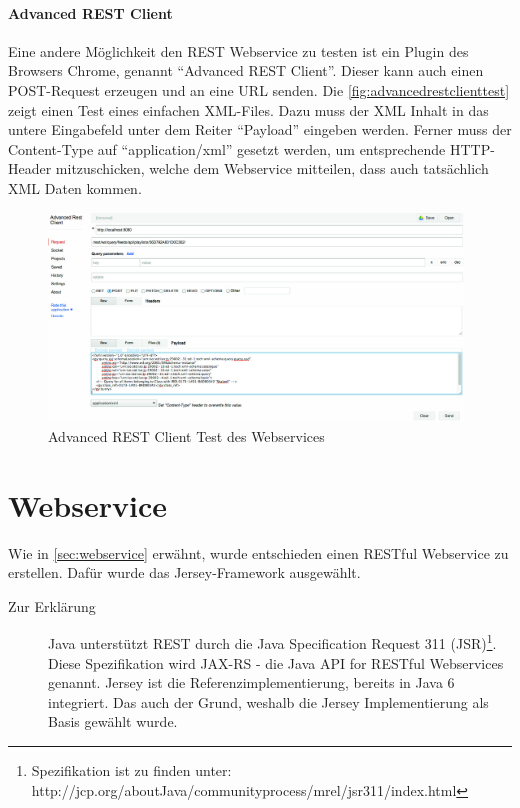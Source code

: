 \paragraph{Advanced REST Client} 

Eine andere Möglichkeit den \gls{REST} Webservice zu testen ist ein Plugin des Browsers Chrome, genannt \enquote{Advanced REST Client}. Dieser kann auch einen POST-Request erzeugen und an eine URL senden. Die \autoref{fig:advancedrestclienttest} zeigt einen Test eines einfachen XML-Files. Dazu muss der XML Inhalt in das untere Eingabefeld unter dem Reiter \enquote{Payload} eingeben werden. Ferner muss der Content-Type auf \enquote{application/xml} gesetzt werden, um entsprechende HTTP-Header mitzuschicken, welche dem Webservice mitteilen, dass auch tatsächlich XML Daten kommen. 

\begin{figure}[htbp]
	\centering
		\includegraphics[width=0.98\textwidth]{images/advanced_rest_client_test.jpg}
	\caption{Advanced REST Client Test des Webservices}
	\label{fig:advancedrestclienttest}
\end{figure}

\section{Webservice}\label{kap:webservice}

Wie in \autoref{sec:webservice} erwähnt, wurde entschieden einen \gls{REST}ful \gls{Webservice} zu erstellen. Dafür wurde das \gls{Jersey}-Framework ausgewählt. 

\begin{description}
\item[Zur Erklärung] Java unterstützt REST durch die Java Specification Request 311 (JSR)\footnote{Spezifikation ist zu finden unter: http://jcp.org/aboutJava/communityprocess/mrel/jsr311/index.html}. Diese Spezifikation wird JAX-RS - die Java API for RESTful Webservices genannt. Jersey ist die Referenzimplementierung, bereits in Java 6 integriert. Das auch der Grund, weshalb die Jersey Implementierung als Basis gewählt wurde.  
\end{description}

